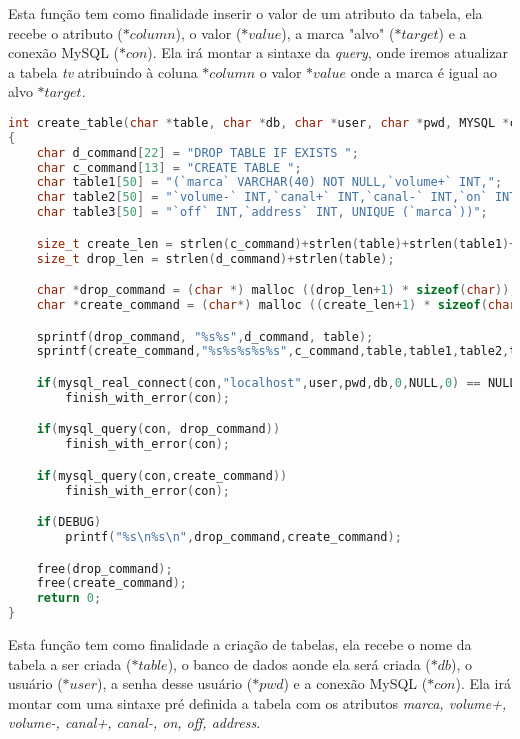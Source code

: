 Esta fun\c{c}\~{a}o tem como finalidade inserir o valor de um atributo da tabela, ela recebe o atributo 
(\textit{$*column$}), o valor (\textit{$*value$}), a marca "alvo" (\textit{$*target$}) e a conex\~{a}o MySQL 
(\textit{$*con$}). Ela ir\'{a} montar a sintaxe da \textit{query}, onde iremos atualizar a tabela \textit{tv} 
atribuindo \`{a} coluna \textit{$*column$} o valor \textit{$*value$} onde a marca \'{e} igual ao alvo 
\textit{$*target$}.

\begin{lstlisting}[language=c, caption={fun\c{c}\~{a}o $create\_table()$}, label={lst:dbphi4}]
int create_table(char *table, char *db, char *user, char *pwd, MYSQL *con)
{
	char d_command[22] = "DROP TABLE IF EXISTS ";
	char c_command[13] = "CREATE TABLE ";
	char table1[50] = "(`marca` VARCHAR(40) NOT NULL,`volume+` INT,";
	char table2[50] = "`volume-` INT,`canal+` INT,`canal-` INT,`on` INT,";
	char table3[50] = "`off` INT,`address` INT, UNIQUE (`marca`))";

	size_t create_len = strlen(c_command)+strlen(table)+strlen(table1)+strlen(table2)+strlen(table3);
	size_t drop_len = strlen(d_command)+strlen(table);

	char *drop_command = (char *) malloc ((drop_len+1) * sizeof(char));
	char *create_command = (char*) malloc ((create_len+1) * sizeof(char));

	sprintf(drop_command, "%s%s",d_command, table);
	sprintf(create_command,"%s%s%s%s%s",c_command,table,table1,table2,table3);

	if(mysql_real_connect(con,"localhost",user,pwd,db,0,NULL,0) == NULL)
		finish_with_error(con);

	if(mysql_query(con, drop_command))
		finish_with_error(con);

	if(mysql_query(con,create_command))
		finish_with_error(con);

	if(DEBUG)
		printf("%s\n%s\n",drop_command,create_command);

	free(drop_command);
	free(create_command);
	return 0;
}
\end{lstlisting}

Esta fun\c{c}\~{a}o tem como finalidade a cria\c{c}\~{a}o de tabelas, ela recebe o nome da tabela a ser criada
(\textit{$*table$}), o banco de dados aonde ela ser\'{a} criada (\textit{$*db$}), o usu\'{a}rio (\textit{$*user$}), a 
senha desse usu\'{a}rio (\textit{$*pwd$}) e a conex\~{a}o MySQL (\textit{$*con$}). Ela ir\'{a} montar com uma sintaxe 
pr\'{e} definida a tabela com os atributos \textit{marca, volume+, volume-, canal+, canal-, on, off, address}.

